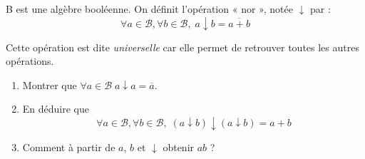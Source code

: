 \begin{exercice}
    B est une algèbre booléenne. On définit l'opération « nor »{}, notée $\downarrow$ par : $$\forall a\in\mathcal{B},\forall b\in\mathcal{B},\; a\downarrow b = \overline{a+b}$$

    Cette opération est dite \textit{universelle} car elle permet de retrouver toutes les autres opérations.

    \begin{enumerate}
        \item 	Montrer que $\forall a\in\mathcal{B}\; a\downarrow a = \overline{a}$.
        \item 	En déduire que $$\forall a\in\mathcal{B},\forall b\in\mathcal{B},\; (a\downarrow b)\downarrow(a\downarrow b) = a+b$$
        \item 	Comment à partir de $a$, $b$ et $\downarrow$ obtenir $ab$ ?\\
    \end{enumerate}
\end{exercice}

